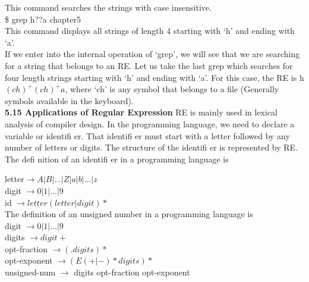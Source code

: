 \documentclass{article}
\begin{document}
\vspace*{0.5cm}
\hspace*{0.5cm} This command searches the strings with case insensitive.\\

\hspace*{4cm}  \$ grep h??a chapter5\\

\hspace*{0.5cm} This command displays all strings of length 4 starting with ‘h’ and ending with ‘a’.\\
\hspace*{0.5cm} If we enter into the internal operation of ‘grep’, we will see that we are searching for a string that
belongs to an RE. Let us take the last grep which searches for four length strings starting with ‘h’ and
ending with ‘a’. For this case, the RE is h$(ch)^+(ch)^+a$, where ‘ch’ is any symbol that belongs to a file
(Generally symbols available in the keyboard).\\

\vspace*{0.3cm}
\large{
\textbf{5.15 Applications of Regular Expression}
}
\small{
RE is mainly used in lexical analysis of compiler design. In the programming language, we need to
declare a variable or identifi er. That identifi er must start with a letter followed by any number of letters
or digits. The structure of the identifi er is represented by RE. The defi nition of an identifi er in a
programming language is\\
}

\hspace*{4cm} letter$ \rightarrow A | B | ... | Z | a | b | ... | z$ \\
\hspace*{4cm} digit $ \rightarrow 0 | 1 | ... | 9$ \\
\hspace*{4cm} id $ \rightarrow letter (letter | digit) *$ \\

\vspace*{0.2cm}
The definition of an unsigned number in a programming language is\\

\vspace*{0.2cm}
\hspace*{4cm} digit $ \rightarrow 0 | 1 | ... | 9$ \\
\hspace*{4cm} digits $ \rightarrow digit +$ \\
\hspace*{3.5cm} opt-fraction $ \rightarrow (. digits) *$ \\
\hspace*{3cm} opt-exponent $ \rightarrow (E (+ | -) * digits) *$ \\
\hspace*{2cm} unsigned-num $\rightarrow$ digits opt-fraction opt-exponent\\
\end{document}
